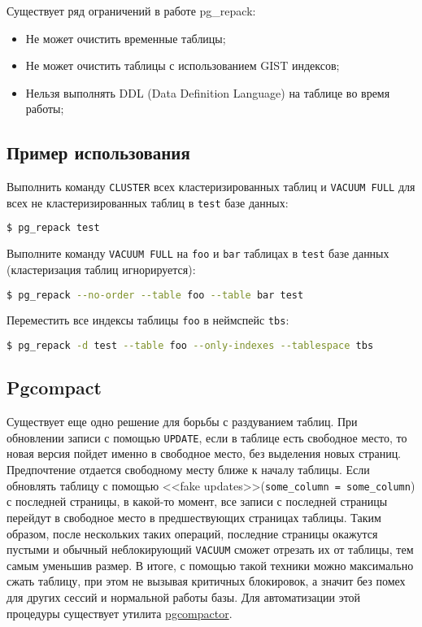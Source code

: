 Существует ряд ограничений в работе pg\_repack:

\begin{itemize}
  \item Не может очистить временные таблицы;
  \item Не может очистить таблицы с использованием GIST индексов;
  \item Нельзя выполнять DDL (Data Definition Language) на таблице во время работы;
\end{itemize}


\subsection{Пример использования}

Выполнить команду \lstinline!CLUSTER! всех кластеризированных таблиц и \lstinline!VACUUM FULL! для всех не кластеризированных таблиц в \lstinline!test! базе данных:

\begin{lstlisting}[language=Bash,label=lst:pgrepack1]
$ pg_repack test
\end{lstlisting}

Выполните команду \lstinline!VACUUM FULL! на \lstinline!foo! и \lstinline!bar! таблицах в \lstinline!test! базе данных (кластеризация таблиц игнорируется):

\begin{lstlisting}[language=Bash,label=lst:pgrepack2]
$ pg_repack --no-order --table foo --table bar test
\end{lstlisting}

Переместить все индексы таблицы \lstinline!foo! в неймспейс \lstinline!tbs!:

\begin{lstlisting}[language=Bash,label=lst:pgrepack3]
$ pg_repack -d test --table foo --only-indexes --tablespace tbs
\end{lstlisting}


\subsection{Pgcompact}

Существует еще одно решение для борьбы с раздуванием таблиц. При обновлении записи с помощью \lstinline!UPDATE!, если в таблице есть свободное место, то новая версия пойдет именно в свободное место, без выделения новых страниц. Предпочтение отдается свободному месту ближе к началу таблицы. Если обновлять таблицу с помощью <<fake updates>>(\lstinline!some_column = some_column!) с последней страницы, в какой-то момент, все записи с последней страницы перейдут в свободное место в предшествующих страницах таблицы. Таким образом, после нескольких таких операций, последние страницы окажутся пустыми и обычный неблокирующий \lstinline!VACUUM! сможет отрезать их от таблицы, тем самым уменьшив размер. В итоге, с помощью такой техники можно максимально сжать таблицу, при этом не вызывая критичных блокировок, а значит без помех для других сессий и нормальной работы базы. Для автоматизации этой процедуры существует утилита \href{https://github.com/grayhemp/pgtoolkit}{pgcompactor}.

